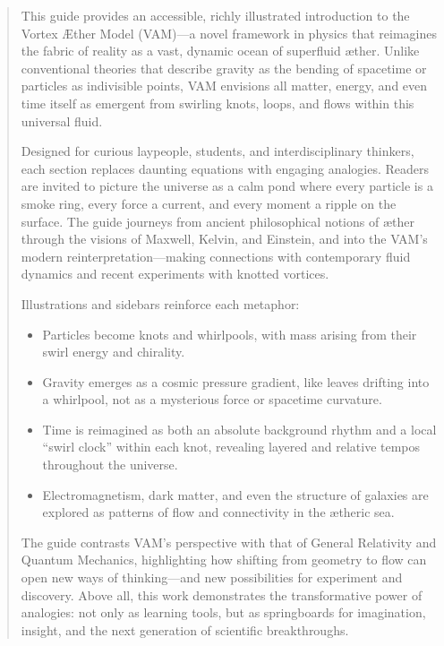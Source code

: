 \documentclass[a4paper,12pt]{article}
\begin{document}
        \titlepageOpen



        \begin{abstract}

            This guide provides an accessible, richly illustrated introduction to the Vortex Æther Model (VAM)—a novel framework in physics that reimagines the fabric of reality as a vast, dynamic ocean of superfluid æther. Unlike conventional theories that describe gravity as the bending of spacetime or particles as indivisible points, VAM envisions all matter, energy, and even time itself as emergent from swirling knots, loops, and flows within this universal fluid.

            Designed for curious laypeople, students, and interdisciplinary thinkers, each section replaces daunting equations with engaging analogies. Readers are invited to picture the universe as a calm pond where every particle is a smoke ring, every force a current, and every moment a ripple on the surface. The guide journeys from ancient philosophical notions of æther through the visions of Maxwell, Kelvin, and Einstein, and into the VAM’s modern reinterpretation—making connections with contemporary fluid dynamics and recent experiments with knotted vortices.

            Illustrations and sidebars reinforce each metaphor:

            \begin{itemize}
                \item             Particles become knots and whirlpools, with mass arising from their swirl energy and chirality.
                \item             Gravity emerges as a cosmic pressure gradient, like leaves drifting into a whirlpool, not as a mysterious force or spacetime curvature.
                \item             Time is reimagined as both an absolute background rhythm and a local “swirl clock” within each knot, revealing layered and relative tempos throughout the universe.
                \item             Electromagnetism, dark matter, and even the structure of galaxies are explored as patterns of flow and connectivity in the ætheric sea.
            \end{itemize}

            The guide contrasts VAM’s perspective with that of General Relativity and Quantum Mechanics, highlighting how shifting from geometry to flow can open new ways of thinking—and new possibilities for experiment and discovery. Above all, this work demonstrates the transformative power of analogies: not only as learning tools, but as springboards for imagination, insight, and the next generation of scientific breakthroughs.

        \end{abstract}
\end{document}
